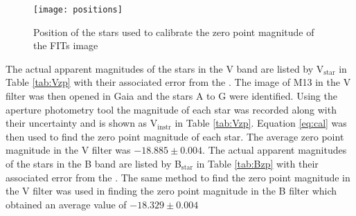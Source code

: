 \documentclass[10pt]{article}
\begin{document}
\begin{wrapfigure}{R}{0.29\textwidth}
	\centering
	\texttt{[image: positions]}
	\caption{Position of the stars used to calibrate the zero point magnitude of the FITs image}
	\label{fig:position}
\end{wrapfigure}

The actual apparent magnitudes of the stars in the V band are listed by V$_{\text{star}}$ in Table \ref{tab:Vzp} with their associated error from the \citet{labhandbook}. The image of M13 in the V filter was then opened in Gaia and the stars A to G were identified. Using the aperture photometry tool the magnitude of each star was recorded along with their uncertainty and is shown as V$_{ \text{instr}}$ in Table \ref{tab:Vzp}. Equation \ref{eq:cal} was then used to find the zero point magnitude of each star. The average zero point magnitude in the V filter was $-18.885 \pm 0.004$. The actual apparent magnitudes of the stars in the B band are listed by B$_{ \text{star}}$ in Table \ref{tab:Bzp} with their associated error from the \citet{labhandbook}. The same method to find the zero point magnitude in the V filter was used in finding the zero point magnitude in the B filter which obtained an average value of $-18.329 \pm 0.004$
\end{document}
